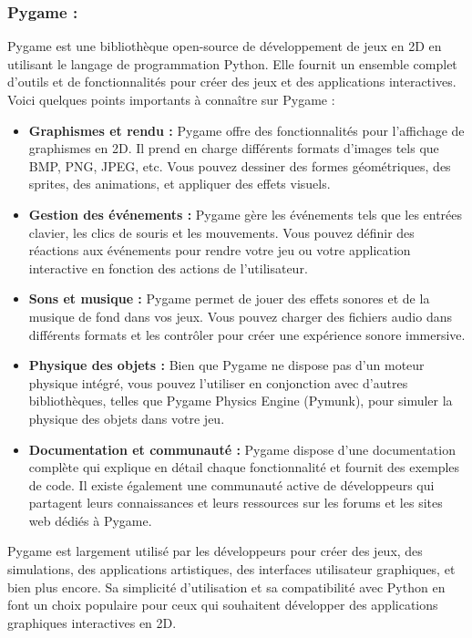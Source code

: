 \documentclass[12pt,a4paper]{report}
\begin{document}
\subsubsection{Pygame :} 
Pygame est une bibliothèque open-source de développement de jeux en 2D en utilisant le langage de programmation Python. Elle fournit un ensemble complet d'outils et de fonctionnalités pour créer des jeux et des applications interactives.
\\
Voici quelques points importants à connaître sur Pygame :
\begin{itemize}
  \item {\bfseries Graphismes et rendu :} Pygame offre des fonctionnalités pour l'affichage de graphismes en 2D. Il prend en charge différents formats d'images tels que BMP, PNG, JPEG, etc. Vous pouvez dessiner des formes géométriques, des sprites, des animations, et appliquer des effets visuels.

  \item {\bfseries Gestion des événements :} Pygame gère les événements tels que les entrées clavier, les clics de souris et les mouvements. Vous pouvez définir des réactions aux événements pour rendre votre jeu ou votre application interactive en fonction des actions de l'utilisateur.

  \item {\bfseries Sons et musique :} Pygame permet de jouer des effets sonores et de la musique de fond dans vos jeux. Vous pouvez charger des fichiers audio dans différents formats et les contrôler pour créer une expérience sonore immersive.

  \item {\bfseries Physique des objets :} Bien que Pygame ne dispose pas d'un moteur physique intégré, vous pouvez l'utiliser en conjonction avec d'autres bibliothèques, telles que Pygame Physics Engine (Pymunk), pour simuler la physique des objets dans votre jeu.

  \item {\bfseries Documentation et communauté :} Pygame dispose d'une documentation complète qui explique en détail chaque fonctionnalité et fournit des exemples de code. Il existe également une communauté active de développeurs qui partagent leurs connaissances et leurs ressources sur les forums et les sites web dédiés à Pygame.
\end{itemize}

Pygame est largement utilisé par les développeurs pour créer des jeux, des simulations, des applications artistiques, des interfaces utilisateur graphiques, et bien plus encore. Sa simplicité d'utilisation et sa compatibilité avec Python en font un choix populaire pour ceux qui souhaitent développer des applications graphiques interactives en 2D.
\end{document}
